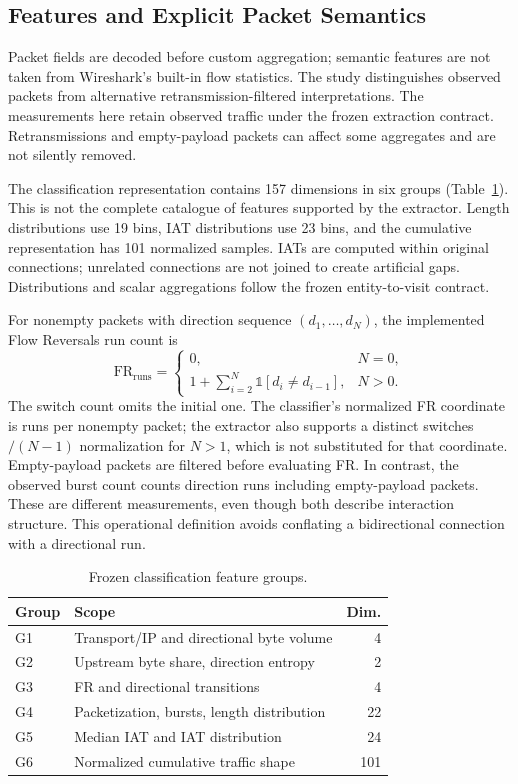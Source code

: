 \subsection{Features and Explicit Packet Semantics}
Packet fields are decoded before custom aggregation; semantic features are not taken from Wireshark's built-in flow statistics. The study distinguishes observed packets from alternative retransmission-filtered interpretations. The measurements here retain observed traffic under the frozen extraction contract. Retransmissions and empty-payload packets can affect some aggregates and are not silently removed.

The classification representation contains 157 dimensions in six groups (Table~\ref{tab:groups}). This is not the complete catalogue of features supported by the extractor. Length distributions use 19 bins, IAT distributions use 23 bins, and the cumulative representation has 101 normalized samples. IATs are computed within original connections; unrelated connections are not joined to create artificial gaps. Distributions and scalar aggregations follow the frozen entity-to-visit contract.

For nonempty packets with direction sequence $(d_1,\ldots,d_N)$, the implemented Flow Reversals run count is
\begin{equation}
 \mathrm{FR}_{\mathrm{runs}}=\begin{cases}0,&N=0,\\1+\sum_{i=2}^{N}\mathbb{1}[d_i\ne d_{i-1}],&N>0.\end{cases}
\end{equation}
The switch count omits the initial one. The classifier's normalized FR coordinate is runs per nonempty packet; the extractor also supports a distinct switches$/ (N-1)$ normalization for $N>1$, which is not substituted for that coordinate. Empty-payload packets are filtered before evaluating FR. In contrast, the observed burst count counts direction runs including empty-payload packets. These are different measurements, even though both describe interaction structure. This operational definition avoids conflating a bidirectional connection with a directional run.

\begin{table}[t]\centering\caption{Frozen classification feature groups.}\label{tab:groups}
\small\begin{tabular}{lp{5.0cm}r}\toprule Group & Scope & Dim.\\\midrule
G1 & Transport/IP and directional byte volume & 4\\
G2 & Upstream byte share, direction entropy & 2\\
G3 & FR and directional transitions & 4\\
G4 & Packetization, bursts, length distribution & 22\\
G5 & Median IAT and IAT distribution & 24\\
G6 & Normalized cumulative traffic shape & 101\\\bottomrule\end{tabular}
\end{table}

